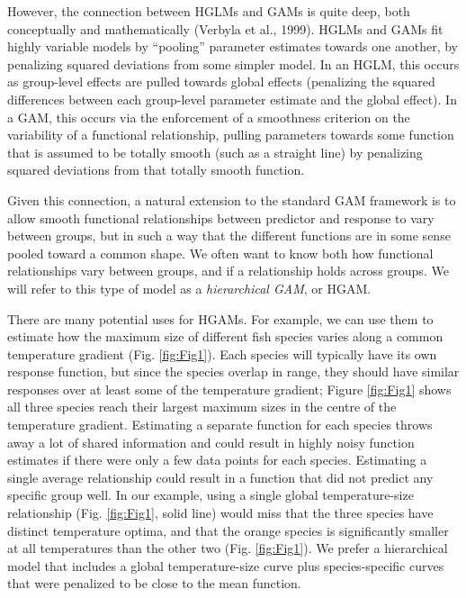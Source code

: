 \documentclass[12pt]{article}
\begin{document}
However, the connection between HGLMs and GAMs is quite deep, both
conceptually and mathematically (Verbyla et al., 1999). HGLMs and GAMs
fit highly variable models by ``pooling'' parameter estimates towards
one another, by penalizing squared deviations from some simpler model.
In an HGLM, this occurs as group-level effects are pulled towards global
effects (penalizing the squared differences between each group-level
parameter estimate and the global effect). In a GAM, this occurs via the
enforcement of a smoothness criterion on the variability of a functional
relationship, pulling parameters towards some function that is assumed
to be totally smooth (such as a straight line) by penalizing squared
deviations from that totally smooth function.

Given this connection, a natural extension to the standard GAM framework
is to allow smooth functional relationships between predictor and
response to vary between groups, but in such a way that the different
functions are in some sense pooled toward a common shape. We often want
to know both how functional relationships vary between groups, and if a
relationship holds across groups. We will refer to this type of model as
a \emph{hierarchical GAM}, or HGAM.

There are many potential uses for HGAMs. For example, we can use them to
estimate how the maximum size of different fish species varies along a
common temperature gradient (Fig. \ref{fig:Fig1}). Each species will
typically have its own response function, but since the species overlap
in range, they should have similar responses over at least some of the
temperature gradient; Figure \ref{fig:Fig1} shows all three species
reach their largest maximum sizes in the centre of the temperature
gradient. Estimating a separate function for each species throws away a
lot of shared information and could result in highly noisy function
estimates if there were only a few data points for each species.
Estimating a single average relationship could result in a function that
did not predict any specific group well. In our example, using a single
global temperature-size relationship (Fig. \ref{fig:Fig1}, solid line)
would miss that the three species have distinct temperature optima, and
that the orange species is significantly smaller at all temperatures
than the other two (Fig. \ref{fig:Fig1}). We prefer a hierarchical model
that includes a global temperature-size curve plus species-specific
curves that were penalized to be close to the mean function.
\end{document}
